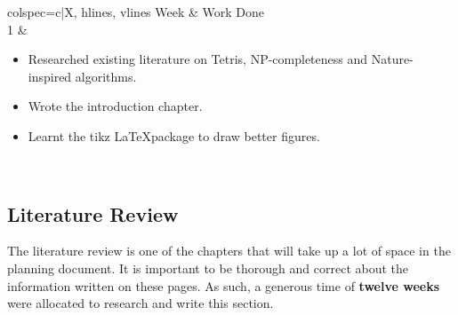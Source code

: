 \documentclass[a4paper, 12pt]{extreport}
\begin{document}
			\begin{longtblr}[
				caption = Weekly breakdown of work done for Introduction Chapter.
				]{colspec={c|X}, hlines, vlines}
				Week & Work Done \\
				1 & \begin{varwidth}[t]{\linewidth}
					\begin{itemize}[topsep=0pt,parsep=0pt]
						\item Researched existing literature on Tetris, NP-completeness and Nature-inspired algorithms.
						\item Wrote the introduction chapter.
						\item Learnt the tikz \LaTeX package to draw better figures.
					\end{itemize}
				\end{varwidth}\\
			\end{longtblr}

		\subsection{Literature Review}
		\label{sec:litrev}
		
			The literature review is one of the chapters that will take up a lot of space in the planning document. It is important to be thorough and correct about the information written on these pages. As such, a generous time of \textbf{twelve weeks} were allocated to research and write this section.
			
\end{document}
